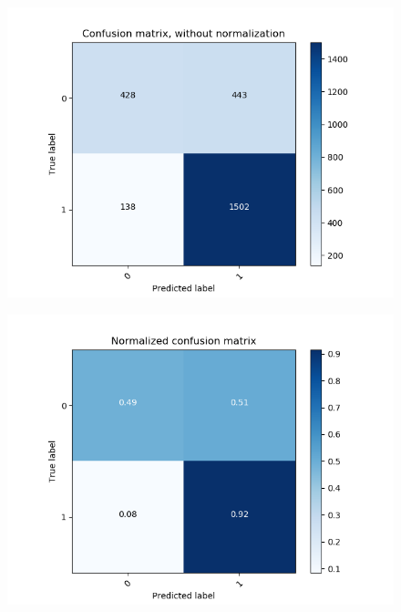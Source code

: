 \begin{figure}
	\centering
	\begin{minipage}[b]{0.45\columnwidth}
		\centering
		\includegraphics[clip, width=\linewidth]{fig/chapter4/3d/confusion_matrix/count_confusion_matrix_False_10_gru}
		\label{fig:count_10}
	\end{minipage}
	\begin{minipage}[b]{0.45\columnwidth}
		\centering
		\includegraphics[clip, width=\linewidth]{fig/chapter4/3d/confusion_matrix/normalized_confusion_matrix_False_10_gru}
		\label{fig: depth10}
	\end{minipage}
	\begin{minipage}[b]{0.45\columnwidth}

\end{minipage}
\end{figure}

